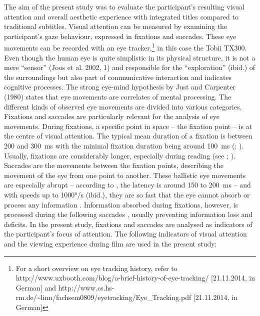 \documentclass[output=paper]{langsci/langscibook}
\begin{document}
The aim of the present study was to evaluate the participant’s resulting visual attention and overall aesthetic experience with integrated titles compared to traditional subtitles. Visual attention can be measured by examining the participant’s gaze behaviour, expressed in fixations and saccades. These eye movements can be recorded with an eye tracker,\footnote{For a short overview on eye tracking history, refer to http://www.uxbooth.com/blog/a-brief-history-of-eye-tracking/ [21.11.2014, in German] and http://www.cs.hs-rm.de/\~{}linn/fachsem0809/eyetracking/Eye\_Tracking.pdf [21.11.2014, in German]} in this case the Tobii TX300. Even though the human eye is quite simplistic in its physical structure, it is not a mere “sensor” (Joos et al. 2002, 1) and responsible for the “exploration” (ibid.) of the surroundings but also part of communicative interaction and indicates cognitive processes. The strong eye-mind hypothesis by Just and Carpenter (1980) states that eye movements are correlates of mental processing. The different kinds of observed eye movements are divided into various categories. Fixations and saccades are particularly relevant for the analysis of eye movements. During fixations, a specific point in space – the fixation point – is at the centre of visual attention. The typical mean duration of a fixation is between 200 and 300~ms with the minimal fixation duration being around 100~ms (\citet[p. 373]{rayner1998}; \citet[p. 2]{flothow2009}). Usually, fixations are considerably longer, especially during reading (see \citet{rayner1998}; \citet{jakobsen2008}). Saccades are the movements between the fixation points, describing the movement of the eye from one point to another. These ballistic eye movements are especially abrupt – according to \citet[p. 17]{joos2005}, the latency is around 150 to 200~ms – and with speeds up to 1000°/s (ibid.), they are so fast that the eye cannot absorb or process any information \citep[p. 4]{flothow2009}. Information absorbed during fixations, however, is processed during the following saccades \citep[p. 6]{kowler2006}, usually preventing information loss and deficits. In the present study, fixations and saccades are analysed as indicators of the participant’s focus of attention. The following indicators of visual attention and the viewing experience during film are used in the present study:
\end{document}
